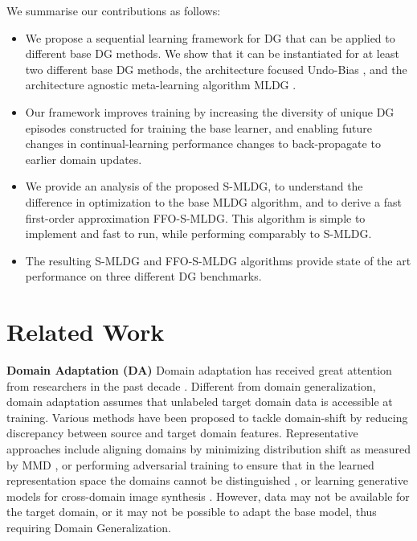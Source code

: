 \documentclass[runningheads]{llncs}
\newcommand{\nameS}{S-MLDG}
\newcommand{\nameFFS}{FFO-\nameS}
\newcommand{\keypoint}[1]{\vspace{0.1cm}\noindent\textbf{#1}\quad}
\begin{document}
We summarise our contributions as follows:
\begin{itemize}[noitemsep]\item We propose a sequential learning framework for DG that can be applied to different base DG methods. We show that it can be instantiated for at least two different base DG methods, the architecture focused Undo-Bias \cite{ECCV12_Khosla}, and the architecture agnostic meta-learning algorithm MLDG \cite{Li2018MLDG}. 
\item Our framework improves training by increasing the diversity of unique DG episodes constructed for training the base learner, and enabling future changes in continual-learning performance changes to back-propagate to earlier domain updates. 
\item We provide an analysis of the proposed \nameS{}, to understand the difference in optimization to the base MLDG algorithm, and to derive a fast first-order approximation \nameFFS{}. This algorithm is simple to implement and fast to run, while performing comparably to \nameS{}. 
\item The resulting \nameS{}  and \nameFFS{} algorithms provide state of the art performance on three different DG benchmarks.
\end{itemize}

\section{Related Work}



\keypoint{Domain Adaptation (DA)} Domain adaptation has received great attention from researchers in the past decade \cite{shai2006nipsdomainadaptation,tzeng2014deep,long2015learning,ganin2015unsupervised,mslongnips2016,bousmalis2016domain,pmlr-v70-saito17a,saito2018MCD}. Different from domain generalization, domain adaptation assumes that unlabeled target domain data is accessible at training. Various methods have been proposed to tackle domain-shift by reducing discrepancy between source and target domain features. Representative approaches include aligning domains by minimizing distribution shift as measured by MMD \cite{tzeng2014deep,long2015learning}, or performing adversarial training to ensure that in the learned representation space the domains cannot be distinguished  \cite{ganin2015unsupervised,saito2018MCD}, or learning generative models for cross-domain image synthesis \cite{NIPS2016_6544,hoffman2018cycada}. However, data may not be available for the target domain, or it may not be possible to adapt the base model, thus requiring Domain Generalization.
\end{document}
